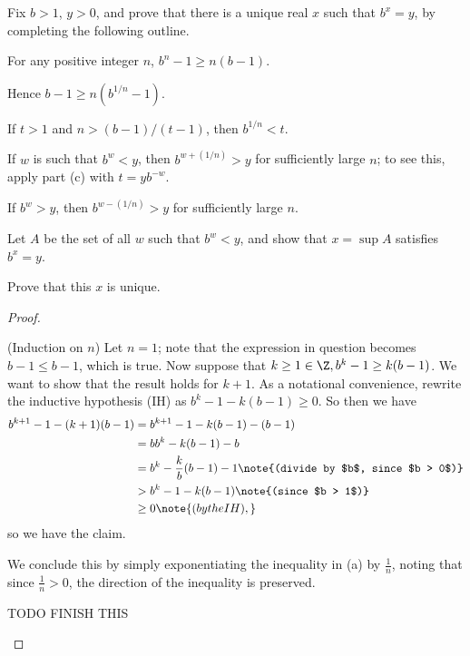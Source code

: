 \documentclass{assignment}
\begin{document}
\begin{question}[7]
  Fix $b > 1$, $y > 0$, and prove that there is a unique real $x$ such that $b^x = y$, by completing
  the following outline.
  \begin{qparts}
    \item For any positive integer $n$, $b^n - 1 \geq n(b-1)$.
    \item Hence $b - 1 \geq n(b^{1/n} - 1)$. 
    \item If $t > 1$ and $n > (b-1)/(t-1)$, then $b^{1/n} < t$.
    \item If $w$ is such that $b^w < y$, then $b^{w + (1/n)} > y$ for sufficiently large $n$; to see this,
      apply part (c) with $t = yb^{-w}$. 
    \item If $b^w > y$, then $b^{w - (1/n)} > y$ for sufficiently large $n$.
    \item Let $A$ be the set of all $w$ such that $b^w < y$, and show that $x = \sup A$ satisfies $b^x 
      = y$. 
    \item Prove that this $x$ is unique.
  \end{qparts}
\end{question}
\begin{proof}
  \begin{qparts}
  \item (Induction on $n$) Let $n = 1$; note that the expression in question becomes $b - 1 \leq b -
    1$, which is true. Now suppose that $k \geq 1\in\Z, b^k - 1 \geq k(b - 1)$. We want to show that
    the result holds for $k + 1$. As a notational convenience, rewrite the inductive hypothesis
    (IH) as $b^k -1 - k(b - 1) \geq 0$. So then we have 
    \begin{align*}
      b^{k+1} - 1 - (k + 1)(b - 1) &= b^{k+1} - 1 - k(b - 1) - (b - 1) \\
                                   &= bb^{k} - k(b-1) - b \\
                                   &= b^k -\frac{k}{b}(b - 1) -1 \note{(divide by $b$, since $b > 0$)} \\
                                   &> b^k -1 -k(b - 1) \note{(since $b > 1$)} \\
                                   &\geq 0 \note{(by the IH),}
    \end{align*}
    so we have the claim.
  \item We conclude this by simply exponentiating the inequality in (a) by $\frac{1}{n}$, noting that
    since $\frac{1}{n} > 0$, the direction of the inequality is preserved.
  \item TODO FINISH THIS
  \end{qparts}
\end{proof}
\end{document}
